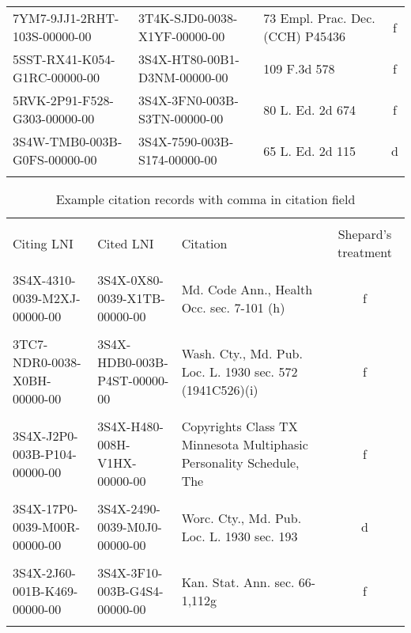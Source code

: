 \documentclass[10pt, letterpaper]{article}
\begin{document}
\begin{spacing}{1.0}
\begin{table}[H]
\begin{adjustwidth}{-0.225in}{}
\begin{tabular}{lllc}
        7YM7-9JJ1-2RHT-103S-00000-00 & 3T4K-SJD0-0038-X1YF-00000-00 & 73 Empl. Prac. Dec. (CCH) P45436 & f\\
        5SST-RX41-K054-G1RC-00000-00 & 3S4X-HT80-00B1-D3NM-00000-00 & 109 F.3d 578 & f\\
        5RVK-2P91-F528-G303-00000-00 & 3S4X-3FN0-003B-S3TN-00000-00 & 80 L. Ed. 2d 674 & f\\
        3S4W-TMB0-003B-G0FS-00000-00 & 3S4X-7590-003B-S174-00000-00 & 65 L. Ed. 2d 115 & d\\[4pt]
        \hline\\[-6pt]
    \end{tabular}
    \label{tab:exCitationValid}
    \end{adjustwidth}
\end{table}

\begin{table}[H]
    \begin{adjustwidth}{-0.225in}{}
        \centering
        \caption{Example citation records with comma in citation field}
        \footnotesize
        \setlength\tabcolsep{2pt}
        \begin{tabular}{llp{2in}c}
            \hline\\[-6pt]
            Citing LNI & Cited LNI & Citation & Shepard's treatment\\[2pt]
            \hline\\[-6pt]
            3S4X-4310-0039-M2XJ-00000-00 & 3S4X-0X80-0039-X1TB-00000-00 & Md. Code Ann., Health Occ. sec. 7-101 (h) & f\\
            & & &\\[-6pt]
            3TC7-NDR0-0038-X0BH-00000-00 & 3S4X-HDB0-003B-P4ST-00000-00 & Wash. Cty., Md. Pub. Loc. L. 1930 sec. 572 (1941C526)(i) & f\\
            & & &\\[-6pt]
            3S4X-J2P0-003B-P104-00000-00 & 3S4X-H480-008H-V1HX-00000-00 & Copyrights Class TX Minnesota Multiphasic Personality Schedule, The & f\\
            & & &\\[-6pt]
            3S4X-17P0-0039-M00R-00000-00 & 3S4X-2490-0039-M0J0-00000-00 & Worc. Cty., Md. Pub. Loc. L. 1930 sec. 193 & d\\
            & & &\\[-6pt]
            3S4X-2J60-001B-K469-00000-00 & 3S4X-3F10-003B-G4S4-00000-00 & Kan. Stat. Ann. sec. 66-1,112g & f\\
            & & &\\[-6pt]

\end{tabular}
\end{adjustwidth}
\end{table}
\end{spacing}
\end{document}
